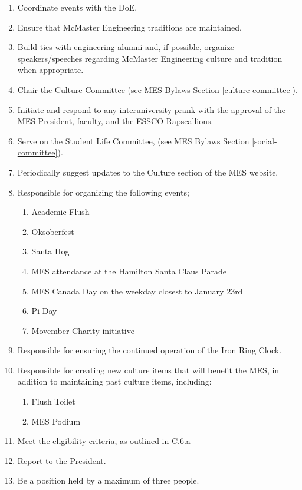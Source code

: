 \begin{enumerate}
 \item
  Coordinate events with the DoE.
 \item
  Ensure that McMaster Engineering traditions are maintained.
 \item
  Build ties with engineering alumni and, if possible, organize speakers/speeches regarding McMaster Engineering culture and tradition when appropriate.
 \item
  Chair the Culture Committee (see MES Bylaws Section \ref{culture-committee}).
 \item
  Initiate and respond to any interuniversity prank with the approval of the MES President, faculty, and the ESSCO Rapscallions.
 \item
  Serve on the Student Life Committee, (see MES Bylaws Section \ref{social-committee}).
 \item
  Periodically suggest updates to the Culture section of the MES website.
 \item
  Responsible for organizing the following events;

  \begin{enumerate}
   \item
    Academic Flush
   \item
    Oksoberfest
   \item
    Santa Hog
   \item
    MES attendance at the Hamilton Santa Claus Parade
   \item
    MES Canada Day on the weekday closest to January 23rd
   \item
    Pi Day
   \item
    Movember Charity initiative
  \end{enumerate}
 \item
  Responsible for ensuring the continued operation of the Iron Ring Clock.
 \item
  Responsible for creating new culture items that will benefit the MES, in addition to maintaining past culture items, including:

  \begin{enumerate}
   \item
    Flush Toilet
   \item
    MES Podium
  \end{enumerate}
 \item
  Meet the eligibility criteria, as outlined in C.6.a %
 \item
  Report to the President.
 \item
  Be a position held by a maximum of three people.

\end{enumerate}

